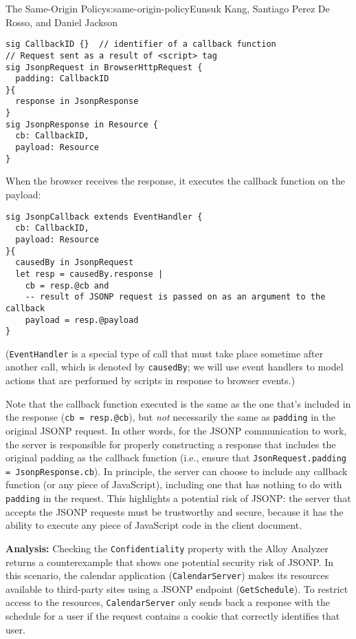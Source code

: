 \begin{aosachapter}{The Same-Origin Policy}{s:same-origin-policy}{Eunsuk Kang, Santiago Perez De Rosso, and Daniel Jackson}
\begin{verbatim}
sig CallbackID {}  // identifier of a callback function
// Request sent as a result of <script> tag
sig JsonpRequest in BrowserHttpRequest {
  padding: CallbackID
}{
  response in JsonpResponse
}
sig JsonpResponse in Resource {
  cb: CallbackID,
  payload: Resource
}
\end{verbatim}

When the browser receives the response, it executes the callback
function on the payload:

\begin{verbatim}
sig JsonpCallback extends EventHandler {
  cb: CallbackID,
  payload: Resource
}{
  causedBy in JsonpRequest
  let resp = causedBy.response | 
    cb = resp.@cb and
    -- result of JSONP request is passed on as an argument to the callback
    payload = resp.@payload
}
\end{verbatim}

(\texttt{EventHandler} is a special type of call that must take place
sometime after another call, which is denoted by \texttt{causedBy}; we
will use event handlers to model actions that are performed by scripts
in response to browser events.)

Note that the callback function executed is the same as the one that's
included in the response (\texttt{cb = resp.@cb}), but \emph{not}
necessarily the same as \texttt{padding} in the original JSONP request.
In other words, for the JSONP communication to work, the server is
responsible for properly constructing a response that includes the
original padding as the callback function (i.e., ensure that
\texttt{JsonRequest.padding = JsonpResponse.cb}). In principle, the
server can choose to include any callback function (or any piece of
JavaScript), including one that has nothing to do with \texttt{padding}
in the request. This highlights a potential risk of JSONP: the server
that accepts the JSONP requests must be trustworthy and secure, because
it has the ability to execute any piece of JavaScript code in the client
document.

\textbf{Analysis:} Checking the \texttt{Confidentiality} property with
the Alloy Analyzer returns a counterexample that shows one potential
security risk of JSONP. In this scenario, the calendar application
(\texttt{CalendarServer}) makes its resources available to third-party
sites using a JSONP endpoint (\texttt{GetSchedule}). To restrict access
to the resources, \texttt{CalendarServer} only sends back a response
with the schedule for a user if the request contains a cookie that
correctly identifies that user.


\end{aosachapter}
